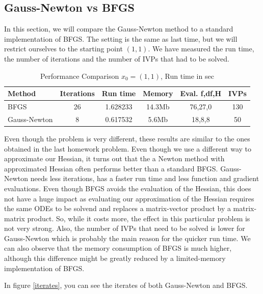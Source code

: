 \documentclass{article}
\begin{document}
\subsection{Gauss-Newton vs BFGS}
In this section, we will compare the Gauss-Newton method to a standard implementation of
BFGS. The setting is the same as last time, but we will restrict ourselves to
the starting point $(1,1)$. We have measured the run time, the number of iterations and the
number of IVPs that had to be solved.
\begin{table}[H]
  \centering
  \begin{tabular}{|l|c|c|c|c|c|}
    \hline
   \textbf{Method} & \textbf{Iterations} & \textbf{Run time} &\textbf{Memory} &\textbf{Eval. f,df,H} & \textbf{IVPs} \\ \hline
  BFGS &26 &1.628233&14.3Mb &76,27,0& 130 \\ \hline
  Gauss-Newton &8 &0.617532&5.6Mb &18,8,8& 50 \\ \hline
  \end{tabular}
  \caption{Performance Comparison $x_{0}=(1,1)$, Run time in sec}
  \label{tab:perform}
\end{table}
Even though the problem is very different, these results are similar to the ones obtained
in the last homework problem. Even though we use a different way to approximate our Hessian,
it turns out that the a Newton method with approximated Hessian often performs better than
a standard BFGS. Gauss-Newton needs less iterations, has a faster run time and less function
and gradient evaluations. Even though BFGS avoids the evaluation of the Hessian, this does not
have a huge impact as evaluating our approximation of the Hessian requires the same ODEs to be solvend and replaces a matrix-vector product by a matrix-matrix product. So, while it costs more,
the effect in this particular problem is not very strong. Also, the number of IVPs that need to be solved is lower for Gauss-Newton
which is probably the main reason for the quicker run time. We can also observe that the memory consumption of BFGS is much higher, although this difference might be greatly reduced by a limited-memory implementation of BFGS.\par
In figure \ref{iterates}, you can see the iterates of both Gauss-Newton and BFGS.
\end{document}
